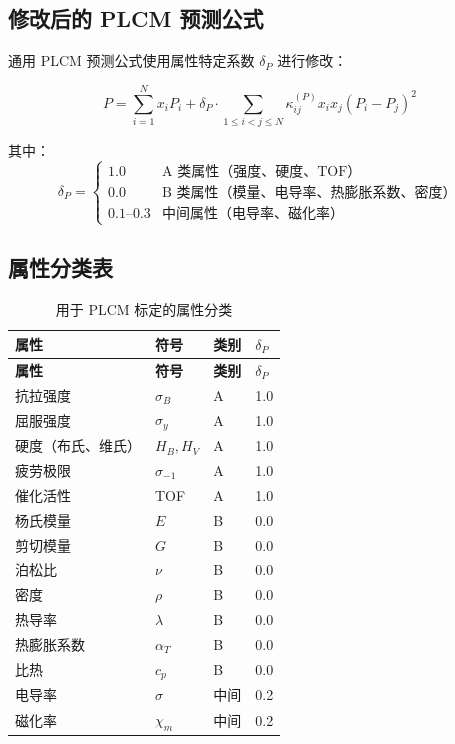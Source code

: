 \documentclass[12pt,a4paper]{article}
\begin{document}
	\subsection{修改后的 PLCM 预测公式}
	
	通用 PLCM 预测公式使用属性特定系数 \(\delta_P\) 进行修改：
	
	\begin{equation}
		\boxed{P = \sum_{i=1}^{N} x_i P_i + \delta_P \cdot \sum_{1\le i<j\le N} \kappa_{ij}^{(P)} x_i x_j (P_i - P_j)^2}
		\label{eq:plcm-modified}
	\end{equation}
	
	其中：
	\[
	\delta_P = \begin{cases}
		1.0 & \text{A 类属性（强度、硬度、TOF）} \\
		0.0 & \text{B 类属性（模量、电导率、热膨胀系数、密度）} \\
		0.1\text{--}0.3 & \text{中间属性（电导率、磁化率）}
	\end{cases}
	\]
	
	\subsection{属性分类表}
	
	\begin{longtable}{p{4cm}p{3cm}p{3cm}p{3cm}}
		\caption{用于 PLCM 标定的属性分类} \label{tab:property-classification} \\
		\toprule
		\textbf{属性} & \textbf{符号} & \textbf{类别} & \(\delta_P\) \\
		\midrule
		\endfirsthead
		\toprule
		\textbf{属性} & \textbf{符号} & \textbf{类别} & \(\delta_P\) \\
		\midrule
		\endhead
		抗拉强度 & \(\sigma_B\) & A & 1.0 \\
		屈服强度 & \(\sigma_y\) & A & 1.0 \\
		硬度（布氏、维氏） & \(H_B, H_V\) & A & 1.0 \\
		疲劳极限 & \(\sigma_{-1}\) & A & 1.0 \\
		催化活性 & TOF & A & 1.0 \\
		\hline
		杨氏模量 & \(E\) & B & 0.0 \\
		剪切模量 & \(G\) & B & 0.0 \\
		泊松比 & \(\nu\) & B & 0.0 \\
		密度 & \(\rho\) & B & 0.0 \\
		热导率 & \(\lambda\) & B & 0.0 \\
		热膨胀系数 & \(\alpha_T\) & B & 0.0 \\
		比热 & \(c_p\) & B & 0.0 \\
		\hline
		电导率 & \(\sigma\) & 中间 & 0.2 \\
		磁化率 & \(\chi_m\) & 中间 & 0.2 \\
		\bottomrule
	\end{longtable}
	
\end{document}
